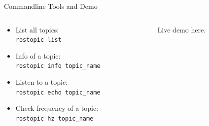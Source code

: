 \documentclass[aspectratio=43]{beamer}
\newcommand{\inline}[1]{\texttt{#1}}
\begin{document}
\begin{frame}{Commandline Tools and Demo}
	\begin{columns}
		\begin{column}{0.5\textwidth}
			\begin{itemize}
				\item List all topics:\\\inline{rostopic list}
				\item Info of a topic:\\\inline{rostopic info topic_name}
				\item Listen to a topic:\\\inline{rostopic echo topic_name}
				\item Check frequency of a topic:\\\inline{rostopic hz topic_name}
			\end{itemize}
		\end{column}
		\begin{column}{0.5\textwidth}
			\centering
			Live demo here.
		\end{column}
	\end{columns}
\end{frame}
\end{document}
